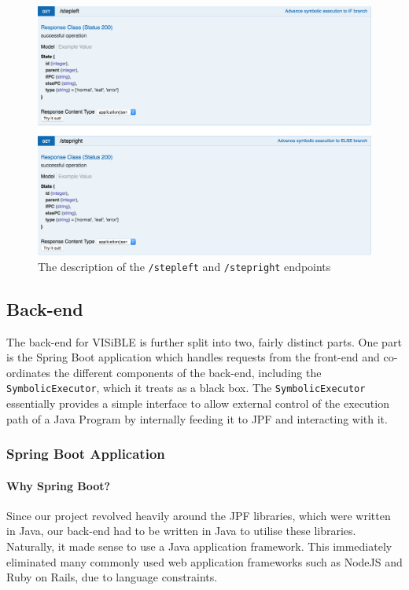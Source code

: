 \documentclass[titlepage,11pt]{article}
\begin{document}
\begin{figure}
\centering
\includegraphics[width=380pt]{step_controller.png}
\caption{The description of the \texttt{/stepleft} and \texttt{/stepright} endpoints}
\label{fig:step}
\end{figure}

\subsection{Back-end}
The back-end for VISiBLE is further split into two, fairly distinct parts. One part is the Spring Boot application which handles requests from the front-end and co-ordinates the different components of the back-end, including the \texttt{SymbolicExecutor}, which it treats as a black box. The \texttt{SymbolicExecutor} essentially provides a simple interface to allow external control of the execution path of a Java Program by internally feeding it to JPF and interacting with it.

\subsubsection{Spring Boot Application}

\paragraph{Why Spring Boot?}

Since our project revolved heavily around the JPF libraries, which were written in Java, our back-end had to be written in Java to utilise these libraries. Naturally, it made sense to use a Java application framework. This immediately eliminated many commonly used web application frameworks such as NodeJS and Ruby on Rails, due to language constraints. \\
\end{document}
